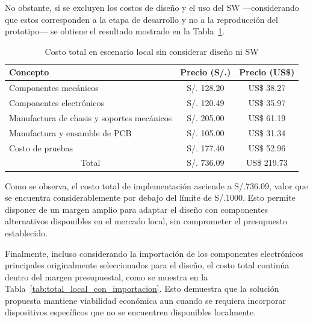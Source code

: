\noindent
No obstante, si se excluyen los costos de diseño y el uso del \ac{SW} —considerando que estos corresponden a la etapa de desarrollo y no a la reproducción del prototipo— se obtiene el resultado mostrado en la Tabla~\ref{tab:total_local_sin_diseno}.

\begin{table}[H]
\centering
\caption{Costo total en escenario local sin considerar diseño ni \ac{SW}}
\label{tab:total_local_sin_diseno}

\vspace{0.5em}

\begin{tabular}{|p{7cm}||c|c|}
\hline
Concepto & Precio (S/.) & Precio (US\$) \\
\hline
Componentes mecánicos 
& S/. 128.20 
& US\$ 38.27 \\
\hline
Componentes electrónicos 
& S/. 120.49 
& US\$ 35.97 \\
\hline
Manufactura de chasis y soportes mecánicos 
& S/. 205.00 
& US\$ 61.19 \\
\hline
Manufactura y ensamble de \ac{PCB} 
& S/. 105.00 
& US\$ 31.34 \\
\hline
Costo de pruebas 
& S/. 177.40 
& US\$ 52.96 \\
\hline
\multicolumn{1}{|c||}{Total} 
& S/. 736.09 
& US\$ 219.73 \\
\hline
\end{tabular}
\end{table}

\noindent
Como se observa, el costo total de implementación asciende a S/.736.09, valor que se encuentra considerablemente por debajo del límite de S/.1000. Esto permite disponer de un margen amplio para adaptar el diseño con componentes alternativos disponibles en el mercado local, sin comprometer el presupuesto establecido.

\noindent
Finalmente, incluso considerando la importación de los componentes electrónicos principales originalmente seleccionados para el diseño, el costo total continúa dentro del margen presupuestal, como se muestra en la Tabla~\ref{tab:total_local_con_importacion}. Esto demuestra que la solución propuesta mantiene viabilidad económica aun cuando se requiera incorporar dispositivos específicos que no se encuentren disponibles localmente.

